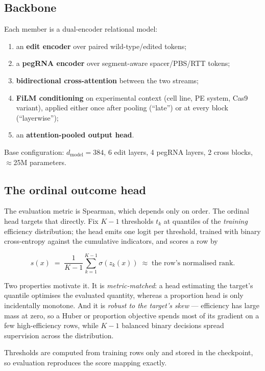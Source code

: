 \documentclass[11pt]{article}
\begin{document}
\subsection{Backbone}

Each member is a dual-encoder relational model:

\begin{enumerate}
\item an \textbf{edit encoder} over paired wild-type/edited tokens;
\item a \textbf{pegRNA encoder} over segment-aware spacer/PBS/RTT tokens;
\item \textbf{bidirectional cross-attention} between the two streams;
\item \textbf{FiLM conditioning} on experimental context (cell line, PE system, Cas9
variant), applied either once after pooling (``late'') or at every block (``layerwise'');
\item an \textbf{attention-pooled output head}.
\end{enumerate}

Base configuration: $d_{\text{model}}{=}384$, 6 edit layers, 4 pegRNA layers, 2 cross
blocks, $\approx$25M parameters.

\subsection{The ordinal outcome head}

The evaluation metric is Spearman, which depends only on order. The ordinal head
targets that directly. Fix $K-1$ thresholds $t_k$ at quantiles of the \emph{training}
efficiency distribution; the head emits one logit per threshold, trained with binary
cross-entropy against the cumulative indicators, and scores a row by

\[
s(x) \;=\; \frac{1}{K-1}\sum_{k=1}^{K-1}\sigma(z_k(x))
\;\approx\; \text{the row's normalised rank.}
\]

Two properties motivate it. It is \emph{metric-matched}: a head estimating the target's
quantile optimises the evaluated quantity, whereas a proportion head is only
incidentally monotone. And it is \emph{robust to the target's skew} --- efficiency has
large mass at zero, so a Huber or proportion objective spends most of its gradient on a
few high-efficiency rows, while $K-1$ balanced binary decisions spread supervision
across the distribution.

Thresholds are computed from training rows only and stored in the checkpoint, so
evaluation reproduces the score mapping exactly.
\end{document}
